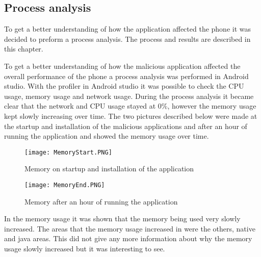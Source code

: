\subsection{Process analysis}
To get a better understanding of how the application affected the phone it was decided to preform a process analysis.
The process and results are described in this chapter. 

To get a better understanding of how the malicious application affected the overall performance of the phone a process analysis was performed in Android studio.
With the profiler in Android studio it was possible to check the CPU usage, memory usage and network usage.
During the process analysis it became clear that the network and CPU usage stayed at 0\%, however the memory usage kept slowly increasing over time.
The two pictures described below were made at the startup and installation of the malicious applications and after an hour of running the application and showed the memory usage over time.

\begin{figure}[H]
    \centering
    \texttt{[image: MemoryStart.PNG]}
    \caption{Memory on startup and installation of the application}
    \label{jordy-memorystartup}
\end{figure}

\begin{figure}[H]
    \centering
    \texttt{[image: MemoryEnd.PNG]}
    \caption{Memory after an hour of running the application}
    \label{jordy-memory1hour}
\end{figure}

In the memory usage it was shown that the memory being used very slowly increased.
The areas that the memory usage increased in were the others, native and java areas.
This did not give any more information about why the memory usage slowly increased but it was interesting to see.